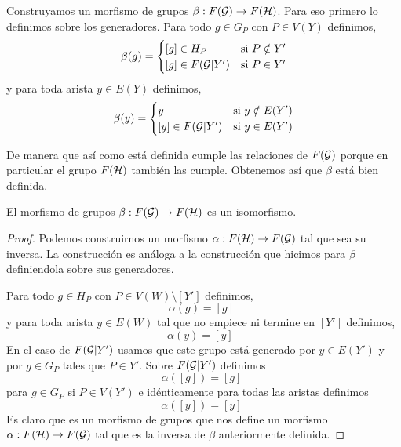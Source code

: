\documentclass[tesis.tex]{subfiles}
\begin{document}
Construyamos un morfismo de grupos $\beta:F({\cal G}) \to F({\cal H})$.
Para eso primero lo definimos sobre los generadores.
Para todo $g \in G_P$ con $P \in V(Y)$ definimos,
\begin{equation*}
	\beta(g) = 
	\begin{cases}
		[g] \in H_P & \text{si} \ P \notin Y' \\
		[g] \in F({\cal G} | Y') & \text{si} \ P \in Y'  \\ 
	\end{cases}
\end{equation*}
y para toda arista $ y \in E(Y)$ definimos,
\begin{equation*}
	\beta(y) = 
	\begin{cases}
		y  & \text{si} \ y \notin E(Y') \\
		[y] \in F({\cal G} | Y') & \text{si} \ y \in E(Y')  \\ 
	\end{cases}
\end{equation*}

De manera que así como está definida cumple las relaciones de $F({\cal G})$ porque en particular el grupo $F({\cal H})$ también las cumple.
Obtenemos así que $\beta$ está bien definida.

\begin{lema}
	El morfismo de grupos $\beta:F({\cal G}) \to F({\cal H})$ es un isomorfismo. 
\end{lema}
\begin{proof}
	Podemos construirnos un morfismo $\alpha:F({\cal H}) \to F({\cal G})$ tal que sea su inversa.
	La construcción es análoga a la construcción que hicimos para $\beta$ definiendola sobre sus generadores.
	
	Para todo $g \in H_P$ con $P \in V(W) \setminus [Y'] $ definimos,
	\begin{equation*}
		\alpha(g) = [g]  \ \ 
	\end{equation*}
	y para toda arista $ y \in E(W)$ tal que no empiece ni termine en $[Y']$ definimos,
	\begin{equation*}
		\alpha(y) = [y]  \ \ \ 
	\end{equation*}
	En el caso de $F({\cal G} | Y')$ usamos que este grupo está generado por $y \in E(Y')$ y por $g \in G_{P}$ tales que $P \in Y'$.
	Sobre $F({\cal G} | Y')$ definimos 
	\begin{equation*}
		\alpha([g]) = [g]  \ \ 
	\end{equation*}
	para $g \in G_P$ si $P \in V(Y')$ e idénticamente para todas las aristas definimos
	\begin{equation*}
		\alpha([y]) = [y]  \ \ 
	\end{equation*}
	Es claro que es un morfismo de grupos que nos define un morfismo $\alpha:F({\cal H}) \to F({\cal G})$ tal que es la inversa de $\beta$ anteriormente definida.
\end{proof}
\end{document}
